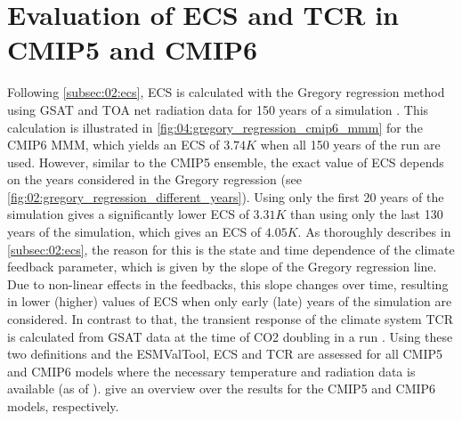 \section{Evaluation of \acs{ECS} and \acs{TCR} in \acs{CMIP}5 and \acs{CMIP}6}
\label{sec:04:evaluation_ecs_and_tcr}

Following \cref{subsec:02:ecs}, \ac{ECS} is calculated with the Gregory
regression method using \ac{GSAT} and \ac{TOA} net radiation data for 150 years
of a  simulation \autocite{Gregory2004}. This calculation is
illustrated in \cref{fig:04:gregory_regression_cmip6_mmm} for the \acs{CMIP}6
\ac{MMM}, which yields an \ac{ECS} of $3.74 \unit{K}$ when all 150 years of the
run are used. However, similar to the \acs{CMIP}5 ensemble, the exact value of
\ac{ECS} depends on the years considered in the Gregory regression (see
\cref{fig:02:gregory_regression_different_years}). Using only the first 20
years of the simulation gives a significantly lower \ac{ECS} of $3.31 \unit{K}$
than using only the last 130 years of the simulation, which gives an \ac{ECS}
of $4.05 \unit{K}$. As thoroughly describes in \cref{subsec:02:ecs}, the reason
for this is the state and time dependence of the climate feedback parameter,
which is given by the slope of the Gregory regression line. Due to non-linear
effects in the feedbacks, this slope changes over time, resulting in lower
(higher) values of \ac{ECS} when only early (late) years of the simulation are
considered. In contrast to that, the transient response of the climate system
\ac{TCR} is calculated from \ac{GSAT} data at the time of \ac{CO2} doubling in
a \onepctcotwo{} run . Using
these two definitions and the \ac{ESMValTool}, \ac{ECS} and \ac{TCR} are
assessed for all \acs{CMIP}5 and \acs{CMIP}6 models where the necessary
temperature and radiation data is available (as of \TheMonth{}).
 give an overview over the
results for the \acs{CMIP}5 and \acs{CMIP}6 models, respectively.

